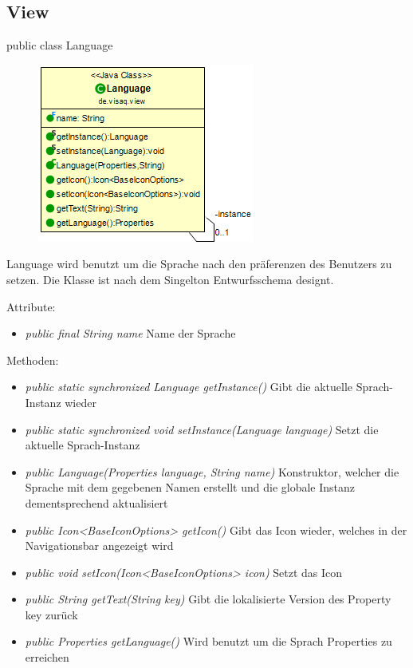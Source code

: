 \subsection{View}

public class Language

\begin{minipage}{0.3\textwidth}
    \begin{figure}[H]
        \includegraphics[scale = 0.5]{media/frontend/view/de.view/Language_Class.png}
    \end{figure}
\end{minipage} \hfill
\begin{minipage}{0.6\textwidth}
    Language wird benutzt um die Sprache nach den präferenzen des Benutzers zu setzen. Die Klasse ist nach dem Singelton Entwurfsschema designt.
\end{minipage}

Attribute:
\begin{itemize}
    \item \emph{public final String name} Name der Sprache
\end{itemize}
Methoden:
\begin{itemize}
    \item \emph{public static synchronized Language getInstance()} Gibt die aktuelle Sprach-Instanz wieder
    \item \emph{public static synchronized void setInstance(Language language)} Setzt die aktuelle Sprach-Instanz
    \item \emph{public Language(Properties language, String name)} Konstruktor, welcher die Sprache mit dem gegebenen Namen erstellt und die globale Instanz dementsprechend aktualisiert
    \item \emph{public Icon<BaseIconOptions> getIcon()} Gibt das Icon wieder, welches in der Navigationsbar angezeigt wird
    \item \emph{public void setIcon(Icon<BaseIconOptions> icon)} Setzt das Icon
    \item \emph{public String getText(String key)} Gibt die lokalisierte Version des Property key zurück
    \item \emph{public Properties getLanguage()} Wird benutzt um die Sprach Properties zu erreichen
\end{itemize}

